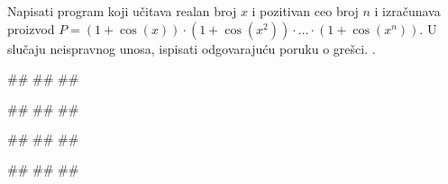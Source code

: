 \begin{Exercise}[label=PET_44] 
Napisati program koji učitava realan broj $x$ i pozitivan ceo broj $n$ i
izračunava proizvod $P = (1 + \cos(x))\cdot(1 + \cos(x^2))\cdot \ldots
\cdot(1 + \cos(x^n))$. 
U slučaju neispravnog unosa, ispisati odgovarajuću poruku o grešci.
.  

\begin{miditest}
\begin{upotreba}{1}
#\naslovInt#
##
##
\end{upotreba}
\end{miditest}
\begin{miditest}
\begin{upotreba}{2}
#\naslovInt#
##
##
\end{upotreba}
\end{miditest}

\begin{miditest}
\begin{upotreba}{3}
#\naslovInt#
##
##
\end{upotreba}
\end{miditest}
\begin{miditest}
\begin{upotreba}{4}
#\naslovInt#
##
##
\end{upotreba}
\end{miditest}

\end{Exercise}
\ifresenja
\begin{Answer}[ref=PET_44]
\end{Answer}
\fi


